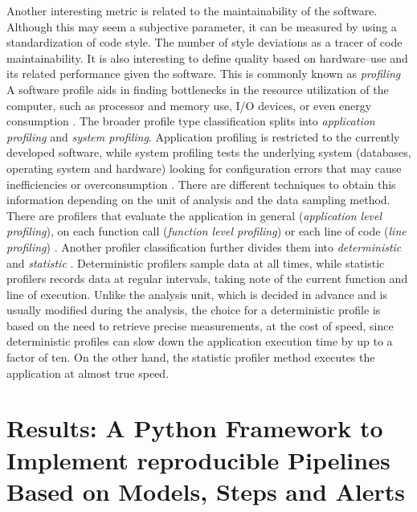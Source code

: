 \documentclass[final,5p,times,twocolumn,authoryear]{elsarticle}
\begin{document}
Another interesting metric is related to the maintainability of the software.
Although this may seem a subjective parameter, it can
be measured by using a standardization of code style. The number
of style deviations as a tracer of code maintainability.
%
It is also interesting to define quality based on hardware--use
and its related performance given the software.
This is commonly known as \textit{profiling}
%
A software profile aids in finding bottlenecks in the resource utilization of the computer,
such as processor and memory use, I/O devices, or even energy consumption \citep{gorelick2014high}.
%
The broader profile type classification splits into
\textit{application profiling} and \textit{system profiling}.
%
Application profiling is restricted to the currently developed
software, while system profiling tests the underlying
system (databases, operating system and hardware) looking for
configuration errors that may cause inefficiencies or overconsumption
\citep{gregg2013systems}.
%
There are different techniques to obtain this information depending on the
unit of analysis and the data sampling method.
%
There are profilers that evaluate the application in general
(\textit{application level profiling}), on each function call
(\textit{function level profiling}) or each line of code
(\textit{line profiling}) \citep{gregg2013systems}.
%
Another profiler classification further divides them into
\textit{deterministic} and \textit{statistic} \citep{roskind2007python}
\citep{schneider_statistical_nodate}.
%
Deterministic profilers sample data at all times, while statistic
profilers records data at regular intervals, taking note of
the current function and line of execution.
%
Unlike the analysis unit, which is decided in advance
and is usually modified during the analysis, the choice for a
deterministic profile is based on the need to retrieve precise
measurements, at the cost of speed, since deterministic profiles can slow
down the application execution time by up to a factor of ten.
%
On the other hand, the statistic profiler method executes the
application at almost true speed.



\section{Results: A Python Framework to Implement reproducible Pipelines
         Based on Models, Steps and Alerts}
\label{section:results}
\end{document}

